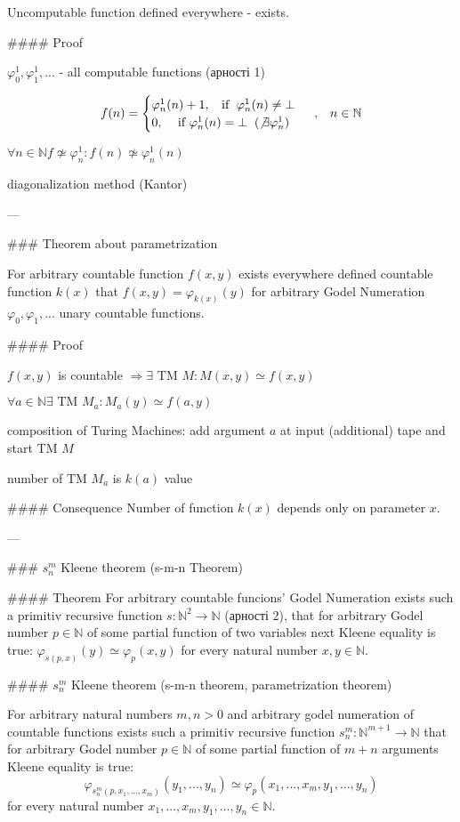 \documentclass[12pt,letterpaper]{report}
\begin{document}
Uncomputable function defined everywhere - exists.

#### Proof

\item $\varphi_0^1, \varphi_1^1, ...$ - all computable functions (арності 1)
\item $$
f(n) = \begin{cases}
    	\varphi_n^1(n) + 1, \;\; \text{ if } \; \varphi_n^1(n) \not= \bot \\
        0,  \;\;\; \text{ if } \varphi_n^1(n) = \bot \;\; (\not\exists \varphi_n^1)
\end{cases} \;,\;\;\;
n \in \mathbb{N}
$$
\item $\forall n \in \mathbb{N} f \not\simeq \varphi_n^1: f(n) \not\simeq \varphi_n^1(n)$
\item diagonalization method (Kantor)

---

### Theorem about parametrization

For arbitrary countable function $f(x, y)$ exists everywhere defined countable function $k(x)$ that $f(x, y) = \varphi_{k(x)}(y)$ for arbitrary Godel Numeration $\varphi_0, \varphi_1, ...$ unary countable functions.

#### Proof
\item $f(x, y)$ is countable $\Rightarrow \exists \text{ TM } M: M(x, y) \simeq f(x, y)$
\item $\forall a \in \mathbb{N} \exists \text{ TM } M_a : M_a(y) \simeq f(a, y)$
\item composition of Turing Machines: add argument $a$ at input (additional) tape and start TM $M$
\item number of TM $M_a$ is $k(a)$ value

#### Consequence
Number of function $k(x)$ depends only on parameter $x$.

---

### $s_n^m$ Kleene theorem (s-m-n Theorem)

#### Theorem
For arbitrary countable funcions' Godel Numeration exists such a primitiv recursive function $s: \mathbb{N}^2 \rightarrow \mathbb{N}$ (арності 2), that for arbitrary Godel number $p \in \mathbb{N}$ of some partial function of two variables next Kleene equality is true: $\varphi_{s(p, x)}(y) \simeq \varphi_p(x,y)$ for every natural number $x, y \in \mathbb{N}$. 

#### $s_n^m$ Kleene theorem (s-m-n theorem, parametrization theorem)

For arbitrary natural numbers $m,n > 0$ and arbitrary godel numeration of countable functions exists such a primitiv recursive function $s_n^m : \mathbb{N}^{m+1} \rightarrow \mathbb{N}$ that for arbitrary Godel number $p \in \mathbb{N}$ of some partial function of $m + n$ arguments Kleene equality is true:
\[ \varphi_{s_n^m(p, x_1, ..., x_m)}(y_1, ..., y_n) \simeq \varphi_p(x_1, ..., x_m, y_1, ..., y_n) \]
for every natural number $x_1, ..., x_m, y_1, ..., y_n \in \mathbb{N}$.
\end{document}
